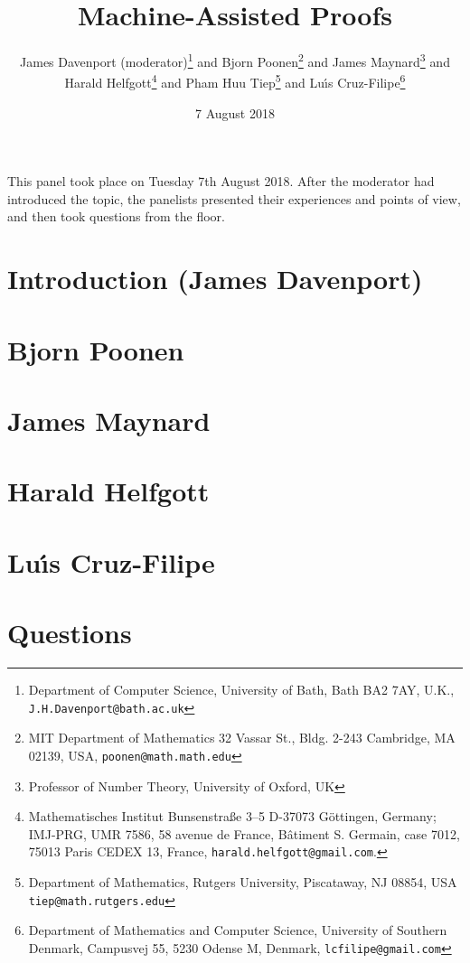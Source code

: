 \documentclass{article}
\begin{document}
\title{Machine-Assisted Proofs}
\author{James Davenport (moderator)\footnote{Department of Computer Science, University of Bath, Bath BA2 7AY, U.K., {\tt J.H.Davenport@bath.ac.uk}}{ } and Bjorn Poonen\footnote{MIT Department of Mathematics
32 Vassar St., Bldg. 2-243
Cambridge, MA 02139, USA, {\tt poonen@math.math.edu}}{ } and James Maynard\footnote{Professor of Number Theory, University of Oxford, UK}{ } and \\Harald Helfgott\footnote{Mathematisches Institut
Bunsenstra{\ss}e 3--5
D-37073 G\"ottingen, Germany;   IMJ-PRG, UMR 7586,
  58 avenue de France, B\^{a}timent S. Germain, case 7012,
  75013 Paris CEDEX 13, France, {\tt harald.helfgott@gmail.com}.}{ } and Pham Huu Tiep\footnote{Department of Mathematics,  Rutgers University, Piscataway, NJ 08854, USA %
{\tt tiep@math.rutgers.edu}}{ } and Lu\'\i{}s Cruz-Filipe\footnote{Department of Mathematics and Computer Science, University of Southern Denmark, Campusvej 55,
5230 Odense M,
Denmark, {\tt lcfilipe@gmail.com}}}
\date{7 August 2018}
\maketitle
This panel took place on Tuesday 7th August 2018. After the moderator had introduced the topic, the panelists presented their experiences and points of view, and then took questions from the floor.
\section{Introduction (James Davenport)}

\section{Bjorn Poonen}

\section{James Maynard}

\section{Harald Helfgott}


\section{Lu\'\i{}s Cruz-Filipe}

\section{Questions}


\end{document}
